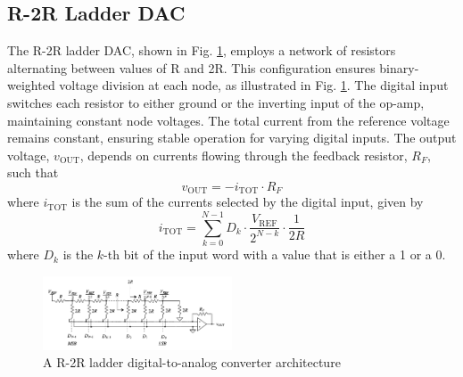 \subsection{R-2R Ladder DAC}
The R-2R ladder DAC, shown in Fig. \ref{fig:r2r_dac}, employs a network of resistors alternating between values of R and 2R. This configuration ensures binary-weighted voltage division at each node, as illustrated in Fig. \ref{fig:r2r_dac}. The digital input switches each resistor to either ground or the inverting input of the op-amp, maintaining constant node voltages. The total current from the reference voltage remains constant, ensuring stable operation for varying digital inputs.
The output voltage, $v_{\text{OUT}}$, depends on currents flowing through the feedback resistor, $R_F$, such that
\begin{equation}
v_{\text{OUT}} = -i_{\text{TOT}} \cdot R_F \tag{29.14}
\end{equation}
where $i_{\text{TOT}}$ is the sum of the currents selected by the digital input, given by
\begin{equation}
i_{\text{TOT}} = \sum_{k=0}^{N-1} D_k \cdot \frac{V_{\text{REF}}}{2^{N-k}} \cdot \frac{1}{2R} \tag{29.15}
\end{equation}
where $D_k$ is the $k$-th bit of the input word with a value that is either a 1 or a 0.
\begin{figure}[H]
	\centering
	\includegraphics[width=0.5\textwidth]{figs/r2r_dac.png}
	\caption{A R-2R ladder digital-to-analog converter architecture}
	\label{fig:r2r_dac}
	\vspace{0.5cm}
\end{figure}
